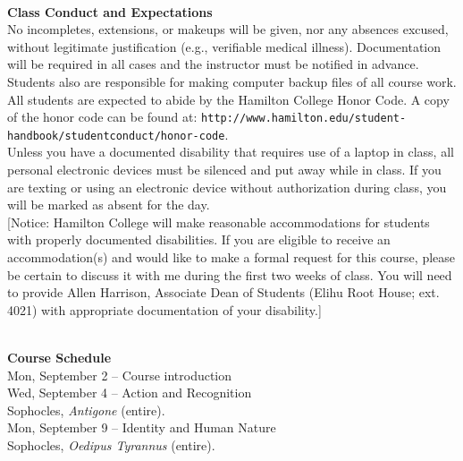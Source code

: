 \documentclass [11pt]{article}
\begin{document}
\ \\
   {\bf Class Conduct and Expectations}\\

No incompletes, extensions, or makeups will be given, nor any absences excused, without legitimate justification (e.g., verifiable medical illness).  Documentation will be required in all cases and the instructor must be notified in advance. Students also are responsible for making computer backup files of all course work. \\

All students are expected to abide by the Hamilton College Honor Code. A copy of the honor code can be found at: {\tt http://www.hamilton.edu/student-handbook/studentconduct/honor-code}. \\

Unless you have a documented disability that requires use of a laptop in class, all personal electronic devices must be silenced and put away while in class. If you are texting or using an electronic device without authorization during class, you will be marked as absent for the day. \\

[Notice: Hamilton College will make reasonable accommodations for students with properly documented disabilities.  If you are eligible to receive an accommodation(s) and would like to make a formal request for this course, please be certain to discuss it with me during the first two weeks of class.  You will need to provide Allen Harrison, Associate Dean of Students (Elihu Root House; ext. 4021) with appropriate documentation of your disability.]

\ \\


   {\bf  Course Schedule}\\


\noindent
Mon, September 2 -- Course introduction \\

\noindent
Wed, September 4 -- Action and Recognition \\
\phantom{Wed, September 4 -- }Sophocles, \textit{Antigone} (entire). \\

\noindent
Mon, September 9 -- Identity and Human Nature \\
\phantom{Mon, September 9 -- }Sophocles, \textit{Oedipus Tyrannus} (entire). \\
\end{document}

